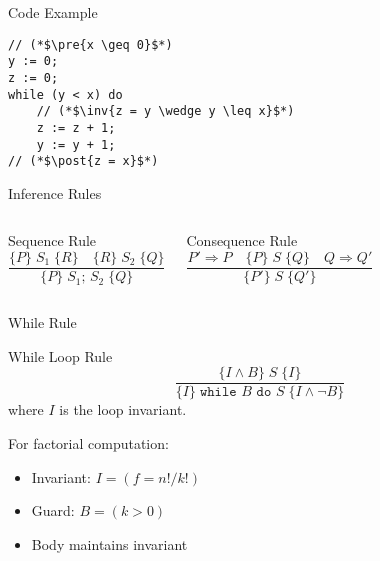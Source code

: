 \documentclass[11pt]{beamer}
\renewcommand{\hoare}[3]{\{#1\}\; #2\; \{#3\}}
\newcommand{\pre}[1]{\{#1\}}
\newcommand{\post}[1]{\{#1\}}
\newcommand{\inv}[1]{\{#1\}}
\newcommand{\seq}[2]{#1;\, #2}
\newcommand{\while}[2]{\texttt{while } #1 \texttt{ do } #2}
\renewcommand{\implies}{\Rightarrow} %
\begin{document}
\begin{frame}[fragile]{Code Example}
    \begin{lstlisting}[language=pseudocode]
// (*$\pre{x \geq 0}$*)
y := 0;
z := 0;
while (y < x) do
    // (*$\inv{z = y \wedge y \leq x}$*)
    z := z + 1;
    y := y + 1;
// (*$\post{z = x}$*)
    \end{lstlisting}
\end{frame}

\begin{frame}{Inference Rules}
    \begin{columns}
        \begin{block}{Sequence Rule}
            \[
            \frac{\hoare{P}{S_1}{R} \quad \hoare{R}{S_2}{Q}}
                 {\hoare{P}{\seq{S_1}{S_2}}{Q}}
            \]
        \end{block}
        
        \begin{block}{Consequence Rule}
            \[
            \frac{P' \implies P \quad \hoare{P}{S}{Q} \quad Q \implies Q'}
                 {\hoare{P'}{S}{Q'}}
            \]
        \end{block}
    \end{columns}
\end{frame}

\begin{frame}{While Rule}
    \begin{block}{While Loop Rule}
        \[
        \frac{\hoare{I \wedge B}{S}{I}}
             {\hoare{I}{\while{B}{S}}{I \wedge \neg B}}
        \]
        where $I$ is the loop invariant.
    \end{block}
    
    \begin{example}
        For factorial computation:
        \begin{itemize}
            \item Invariant: $I = (f = n! / k!)$
            \item Guard: $B = (k > 0)$
            \item Body maintains invariant
        \end{itemize}
    \end{example}
\end{frame}
\end{document}

